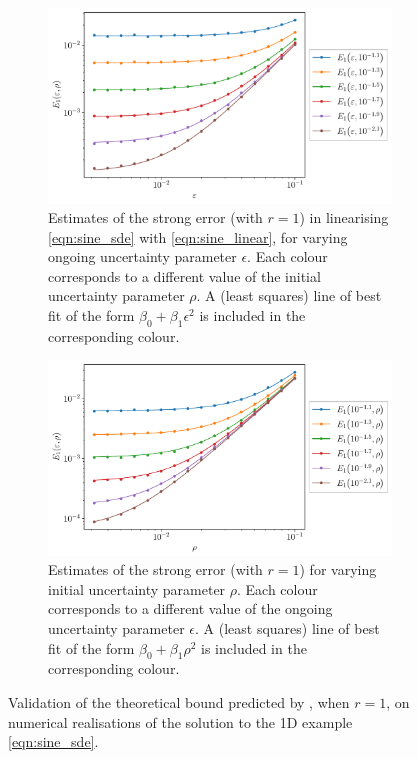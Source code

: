 \begin{figure}
	\begin{center}
		\begin{subfigure}{\textwidth}
			\includegraphics[width=\textwidth]{chp04_paper_numerics/figures/sine/str_err_eps_r_1.0_log.pdf}
			\caption{Estimates of the strong error (with \(r = 1\)) in linearising \cref{eqn:sine_sde} with \cref{eqn:sine_linear}, for varying ongoing uncertainty parameter \(\epsilon\).
				Each colour corresponds to a different value of the initial uncertainty parameter \(\rho\).
				A (least squares) line of best fit of the form \(\beta_0 + \beta_1 \epsilon^2\) is included in the corresponding colour.}
			\label{fig:sine_eps_lines}
		\end{subfigure}
		\begin{subfigure}{\textwidth}
			\includegraphics[width=\textwidth]{chp04_paper_numerics/figures/sine/str_err_rho_r_1.0_log.pdf}
			\caption{Estimates of the strong error (with \(r = 1\)) for varying initial uncertainty parameter \(\rho\).
				Each colour corresponds to a different value of the ongoing uncertainty parameter \(\epsilon\).
				A (least squares) line of best fit of the form \(\beta_0 + \beta_1 \rho^2\) is included in the corresponding colour.}
			\label{fig:sine_delta_lines}
		\end{subfigure}
		\caption{Validation of the theoretical bound predicted by , when \(r = 1\), on numerical realisations of the solution to the 1D example \cref{eqn:sine_sde}.}
		\label{fig:sine_delta_eps_lines}
	\end{center}
\end{figure}

